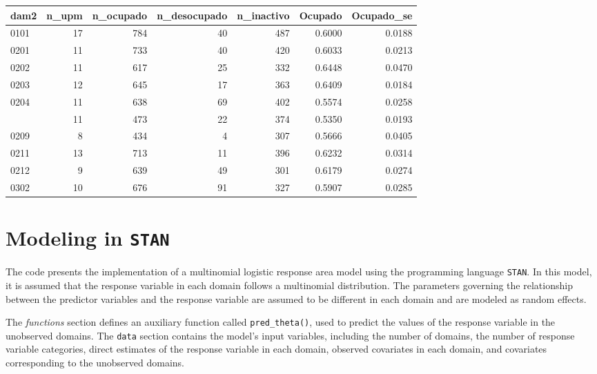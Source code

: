 \documentclass[
  12pt,
]{book}
\begin{document}
\begin{table}[H]
\centering
\centering
\begin{tabular}[t]{lrrrrrr}
\toprule
dam2 & n\_upm & n\_ocupado & n\_desocupado & n\_inactivo & Ocupado & Ocupado\_se\\
\midrule
0101 & 17 & 784 & 40 & 487 & 0.6000 & 0.0188\\
0201 & 11 & 733 & 40 & 420 & 0.6033 & 0.0213\\
0202 & 11 & 617 & 25 & 332 & 0.6448 & 0.0470\\
0203 & 12 & 645 & 17 & 363 & 0.6409 & 0.0184\\
0204 & 11 & 638 & 69 & 402 & 0.5574 & 0.0258\\
\addlinespace
0207 & 11 & 473 & 22 & 374 & 0.5350 & 0.0193\\
0209 & 8 & 434 & 4 & 307 & 0.5666 & 0.0405\\
0211 & 13 & 713 & 11 & 396 & 0.6232 & 0.0314\\
0212 & 9 & 639 & 49 & 301 & 0.6179 & 0.0274\\
0302 & 10 & 676 & 91 & 327 & 0.5907 & 0.0285\\
\bottomrule
\end{tabular}
\end{table}

\hypertarget{modeling-in-stan}{%
\section{\texorpdfstring{Modeling in \texttt{STAN}}{Modeling in STAN}}\label{modeling-in-stan}}

The code presents the implementation of a multinomial logistic response area model using the programming language \texttt{STAN}. In this model, it is assumed that the response variable in each domain follows a multinomial distribution. The parameters governing the relationship between the predictor variables and the response variable are assumed to be different in each domain and are modeled as random effects.

The \emph{functions} section defines an auxiliary function called \texttt{pred\_theta()}, used to predict the values of the response variable in the unobserved domains. The \texttt{data} section contains the model's input variables, including the number of domains, the number of response variable categories, direct estimates of the response variable in each domain, observed covariates in each domain, and covariates corresponding to the unobserved domains.
\end{document}
